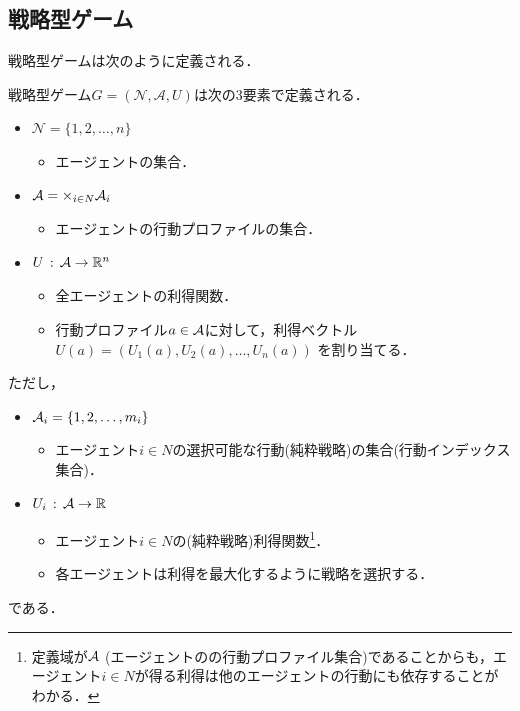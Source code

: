 \documentclass{jsreport}
\begin{document}
\subsection{戦略型ゲーム}
戦略型ゲームは次のように定義される．
\begin{screen}
  \begin{defi}[戦略型ゲーム]
  戦略型ゲーム$G = (\mathcal{N}, \mathcal{A}, U)$は次の3要素で定義される．
  \begin{itemize}
    \item $\mathcal{N} = \{1, 2, \ldots, n\}$
    \begin{itemize}
      \item エージェントの集合．
    \end{itemize}
    \item ${\cal A} = \times_{i \in N} {\cal A}_i$
    \begin{itemize}
      \item エージェントの行動プロファイルの集合．
    \end{itemize}
    \item $U \, : \, {\cal A} \rightarrow \mathbb{R}^n$
    \begin{itemize}
      \item 全エージェントの利得関数．
      \item 行動プロファイル$a \in {\cal A}$に対して，利得ベクトル
      $U(a) = (U_1(a), U_2(a), \ldots, U_n(a))$
      を割り当てる．
    \end{itemize}
  \end{itemize}
  \end{defi}
\end{screen}

ただし，
\begin{itemize}
  \item ${\cal A}_i = \{1, 2, \ldots, m_i\}$
  \begin{itemize}
    \item エージェント$i \in N$の選択可能な行動(純粋戦略)の集合(行動インデックス集合)．
  \end{itemize}
  \item $U_i \, : \, {\cal A} \rightarrow \mathbb{R}$
  \begin{itemize}
    \item エージェント$i \in N$の(純粋戦略)利得関数\footnote{定義域が${\cal A}$ (エージェントのの行動プロファイル集合)であることからも，エージェント$i \in N$が得る利得は他のエージェントの行動にも依存することがわかる．}．
    \item 各エージェントは利得を最大化するように戦略を選択する．
  \end{itemize}
\end{itemize}
である．
\end{document}
